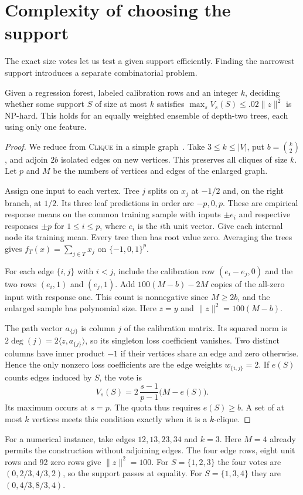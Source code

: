 \section{Complexity of choosing the support}
\label{app:hardness}

The exact size votes let us test a given support efficiently. Finding the
narrowest support introduces a separate combinatorial problem.

\begin{proposition}
\label{prop:support-hardness}
Given a regression forest, labeled calibration rows and an integer $k$,
deciding whether some support $S$ of size at most $k$ satisfies
$\max_s V_s(S)\le .02\|z\|^2$ is NP-hard. This holds for an equally
weighted ensemble of depth-two trees, each using only one feature.
\end{proposition}
\begin{proof}
We reduce from \textsc{Clique} in a simple graph~\citep{karp1972reducibility}.
Take $3\le k\le |V|$, put $b=\binom{k}{2}$, and adjoin $2b$ isolated
edges on new vertices. This preserves all cliques of size $k$. Let $p$
and $M$ be the numbers of vertices and edges of the enlarged graph.

Assign one input to each vertex. Tree $j$ splits on $x_j$ at $-1/2$ and,
on the right branch, at $1/2$. Its three leaf predictions in order are
$-p,0,p$. These are empirical response means on the common training sample
with inputs $\pm e_i$ and respective responses $\pm p$ for $1\le i\le p$,
where $e_i$ is the $i$th unit vector. Give each internal node its training
mean. Every tree then has root value zero. Averaging the trees gives
$f_T(x)=\sum_{j\in T}x_j$ on $\{-1,0,1\}^p$.

For each edge $\{i,j\}$ with $i<j$, include the calibration row
$(e_i-e_j,0)$ and the two rows $(e_i,1)$ and $(e_j,1)$.
Add $100(M-b)-2M$ copies of the all-zero input with response one.
This count is nonnegative since $M\ge 2b$, and the enlarged sample has
polynomial size. Here $z=y$ and $\|z\|^2=100(M-b)$.

The path vector $a_{\{j\}}$ is column $j$ of the calibration matrix.
Its squared norm is $2\deg(j)=2\langle z,a_{\{j\}}\rangle$, so its
singleton loss coefficient vanishes. Two distinct columns have inner
product $-1$ if their vertices share an edge and zero otherwise.
Hence the only nonzero loss coefficients are the edge weights
$w_{\{i,j\}}=2$. If $e(S)$ counts edges induced by $S$, the vote is
\[
  V_s(S)=2\,\frac{s-1}{p-1}\bigl(M-e(S)\bigr).
\]
Its maximum occurs at $s=p$. The quota thus requires $e(S)\ge b$.
A set of at most $k$ vertices meets this condition exactly when it is a
$k$-clique.
\end{proof}

For a numerical instance, take edges $12,13,23,34$ and $k=3$.
Here $M=4$ already permits the construction without adjoining edges.
The four edge rows, eight unit rows and 92 zero rows give $\|z\|^2=100$.
For $S=\{1,2,3\}$ the four votes are $(0,2/3,4/3,2)$, so the support
passes at equality. For $S=\{1,3,4\}$ they are $(0,4/3,8/3,4)$.
